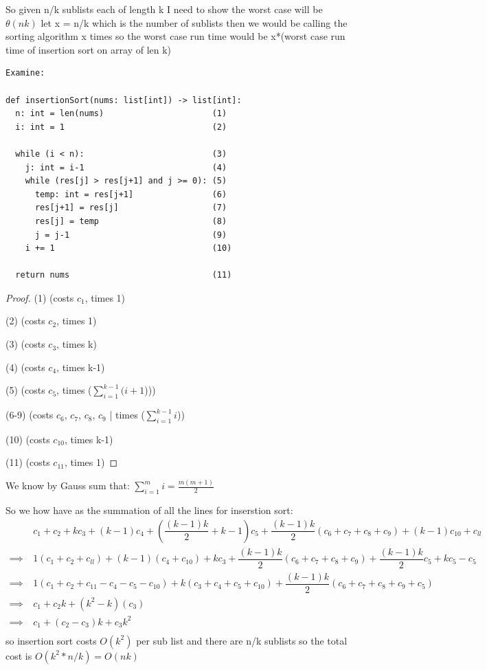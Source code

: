 So given n/k sublists each of length k I need to show the worst case will be $\theta(nk)$
let x = n/k which is the number of sublists then we would be calling the sorting algorithm x times 
so the worst case run time would be x*(worst case run time of insertion sort on array of len k)

\begin{verbatim}
Examine:

def insertionSort(nums: list[int]) -> list[int]:
  n: int = len(nums)                      (1)
  i: int = 1                              (2)

  while (i < n):                          (3)
    j: int = i-1                          (4)
    while (res[j] > res[j+1] and j >= 0): (5)
      temp: int = res[j+1]                (6)
      res[j+1] = res[j]                   (7)
      res[j] = temp                       (8)
      j = j-1                             (9)
    i += 1                                (10)
  
  return nums                             (11)
\end{verbatim}

\begin{proof}
(1) (costs $c_1$, times 1)

(2) (costs $c_2$, times 1)

(3) (costs $c_3$, times k)

(4) (costs $c_4$, times k-1)

(5) (costs $c_5$, times ($\sum_{i=1}^{k-1} (i+1$)))

(6-9) (costs $c_6$, $c_7$, $c_8$, $c_9$ |  times ($\sum_{i=1}^{k-1} i$))

(10) (costs $c_{10}$, times k-1)

(11) (costs $c_{11}$, times 1)
\end{proof}

We know by Gauss sum that: $\sum_{i=1}^{m} i = \frac{m(m+1)}{2}$

So we how have as the summation of all the lines for inserstion sort:\\
\begin{align*}
&c_1 + c_2 + kc_3 + (k-1)c_4 + \left(\dfrac{(k-1)k}{2}+k-1\right)c_5 
+ \dfrac{(k-1)k}{2}\left(c_6 + c_7 + c_8 + c_9\right) + (k-1)c_{10} + c_{ll} \\[6pt]
\implies\ &1\left(c_1 + c_2 + c_{ll}\right) + (k-1)\left(c_4 + c_{10}\right) + kc_3 
+ \dfrac{(k-1)k}{2}\left(c_6 + c_7 + c_8 + c_9\right) + \dfrac{(k-1)k}{2}c_5 + kc_5 - c_5 \\
\implies &1(c_1 + c_2 + c_{11} - c_4 - c_5 - c_{10}) + k(c_3 + c_4 + c_5 + c_{10}) + 
\dfrac{(k-1)k}{2}(c_6 + c_7 + c_8 + c_9 + c_5) \\
\implies &c_1 + c_2k + (k^2 - k)(c_3) \\
\implies &c_1 + (c_2-c_3)k + c_3k^2 \\
\end{align*}
so insertion sort costs $O(k^2)$ per sub list and there are n/k sublists so the total cost is $O(k^2 * n/k) = O(nk)$ \\

